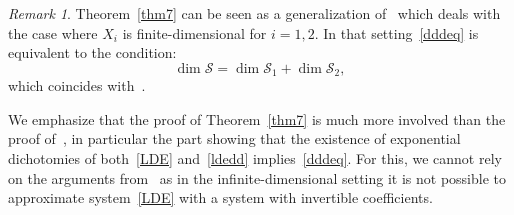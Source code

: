 \documentclass[11pt,reqno,a4paper]{amsart}
\theoremstyle{plain}
\numberwithin{equation}{section}
\theoremstyle{remark}
\newtheorem{remark}{Remark}
\begin{document}
\begin{remark}\label{Remark7}
Theorem~\ref{thm7} can be seen as a generalization of~\cite[Theorem 7]{DP} which deals with the case where $X_i$ is finite-dimensional for $i=1, 2$. In that setting~\eqref{dddeq} is equivalent to the condition:
\[
\dim \mathcal S=\dim \mathcal S_1+\dim \mathcal S_2,
\]
which coincides with~\cite[Eq. (2.16)]{DP}.

We emphasize that the proof of Theorem~\ref{thm7} is much more involved than the proof of~\cite[Theorem 7]{DP}, in particular the part showing that the existence of exponential dichotomies of both~\eqref{LDE} and~\eqref{ldedd} implies~\eqref{dddeq}. For this, we cannot rely on the arguments from~\cite[Remark 4.2]{BFP2} as in the infinite-dimensional setting it is not possible to approximate system~\eqref{LDE} with a system with invertible coefficients. 
\end{remark}
\end{document}
